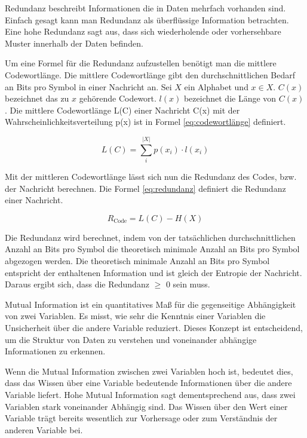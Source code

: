 \documentclass[conference]{IEEEtran}
\begin{document}
Redundanz beschreibt Informationen die in Daten mehrfach vorhanden sind. \cite{friedrichs}
Einfach gesagt kann man Redundanz als überflüssige Information betrachten.
Eine hohe Redundanz sagt aus, dass sich wiederholende oder vorhersehbare Muster innerhalb
der Daten befinden.

Um eine Formel für die Redundanz aufzustellen benötigt man die mittlere Codewortlänge.
Die mittlere Codewortlänge gibt den durchschnittlichen Bedarf an Bits pro Symbol in einer
Nachricht an.
Sei $X$ ein Alphabet und $x \in X$.
$C(x)$ bezeichnet das zu $x$ gehörende Codewort.
$l(x)$ bezeichnet die Länge von $C(x)$.
Die mittlere Codewortlänge L(C) einer Nachricht C(x) mit der Wahrscheinlichkeitsverteilung
p(x) ist in Formel \ref{eq:codewortlänge} definiert.

\begin{equation}
    \label{eq:codewortlänge}
    L(C) = \sum_{i}^{|X|} p(x_i) \cdot l(x_i)
\end{equation}

Mit der mittleren Codewortlänge lässt sich nun die Redundanz des Codes, bzw. der
Nachricht berechnen.
Die Formel \ref{eq:redundanz} definiert die Redundanz einer Nachricht.

\begin{equation}
    \label{eq:redundanz}
    R_{\text{Code}} = L(C) - H(X)
\end{equation}

Die Redundanz wird berechnet, indem von der tatsächlichen durchschnittlichen
Anzahl an Bits pro Symbol die theoretisch minimale Anzahl an Bits pro Symbol
abgezogen werden.
Die theoretisch minimale Anzahl an Bits pro Symbol entspricht der enthaltenen
Information und ist gleich der Entropie der Nachricht.
Daraus ergibt sich, dass die Redundanz $\geq$ 0 sein muss.

Mutual Information ist ein quantitatives Maß für die gegenseitige Abhängigkeit von zwei
Variablen. \cite{shannon}
Es misst, wie sehr die Kenntnis einer Variablen die Unsicherheit über die andere
Variable reduziert.
Dieses Konzept ist entscheidend, um die Struktur von Daten zu verstehen und
voneinander abhängige Informationen zu erkennen.

Wenn die Mutual Information zwischen zwei Variablen hoch ist, bedeutet dies,
dass das Wissen über eine Variable
bedeutende Informationen über die andere Variable liefert.
Hohe Mutual Information sagt dementsprechend aus, dass zwei Variablen stark voneinander
Abhängig sind.
Das Wissen über den Wert einer Variable trägt bereits wesentlich zur Vorhersage
oder zum Verständnis der anderen Variable bei.
\end{document}
